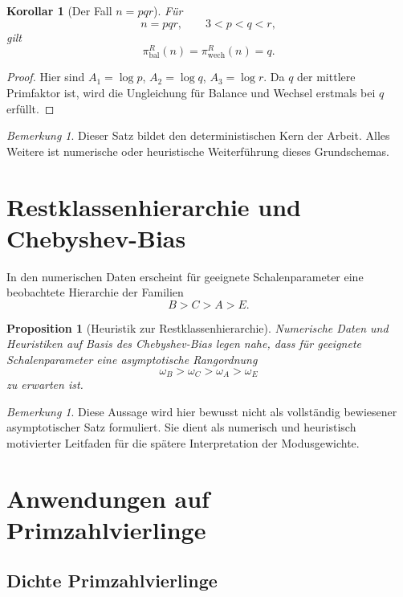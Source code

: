 \documentclass[11pt,a4paper]{article}
\theoremstyle{plain}
\newtheorem{korollar}[satz]{Korollar}
\newtheorem{proposition}[satz]{Proposition}
\theoremstyle{definition}
\theoremstyle{remark}
\newtheorem{bemerkung}[satz]{Bemerkung}
\newcommand{\bal}{\mathrm{bal}}
\newcommand{\wech}{\mathrm{wech}}
\newcommand{\1}{\mathbf{1}}
\begin{document}
	\begin{korollar}[Der Fall \(n=pqr\)]
		\label{kor:pqr}
		Für
		\[
		n=pqr,\qquad 3<p<q<r,
		\]
		gilt
		\[
		\pi_{\bal}^R(n)=\pi_{\wech}^R(n)=q.
		\]
	\end{korollar}
	
	\begin{proof}
		Hier sind \(A_1=\log p\), \(A_2=\log q\), \(A_3=\log r\). Da \(q\) der mittlere Primfaktor ist, wird die Ungleichung für Balance und Wechsel erstmals bei \(q\) erfüllt.
	\end{proof}
	
	\begin{bemerkung}
		Dieser Satz bildet den deterministischen Kern der Arbeit. Alles Weitere ist numerische oder heuristische Weiterführung dieses Grundschemas.
	\end{bemerkung}
	
	\section{Restklassenhierarchie und Chebyshev-Bias}
	\label{sec:bias}
	
	In den numerischen Daten erscheint für geeignete Schalenparameter eine beobachtete Hierarchie der Familien
	\[
	B>C>A>E.
	\]
	
	\begin{proposition}[Heuristik zur Restklassenhierarchie]
		\label{prop:biasheuristik}
		Numerische Daten und Heuristiken auf Basis des Chebyshev-Bias legen nahe, dass für geeignete Schalenparameter eine asymptotische Rangordnung
		\[
		\omega_B>\omega_C>\omega_A>\omega_E
		\]
		zu erwarten ist.
	\end{proposition}
	
	\begin{bemerkung}
		Diese Aussage wird hier bewusst nicht als vollständig bewiesener asymptotischer Satz formuliert. Sie dient als numerisch und heuristisch motivierter Leitfaden für die spätere Interpretation der Modusgewichte.
	\end{bemerkung}
	
	\section{Anwendungen auf Primzahlvierlinge}
	\label{sec:vierlinge}
	
	\subsection{Dichte Primzahlvierlinge}
	
\end{document}
